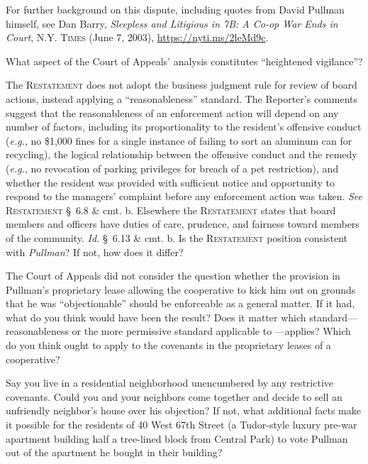 
\item For further background on this dispute, including quotes from David
Pullman himself, see Dan Barry, \textit{Sleepless and Litigious in 7B: A Co-op
War Ends in Court}, \textsc{N.Y. Times} (June 7, 2003),
\url{https://nyti.ms/2leMd9c}.

\item What aspect of the Court of Appeals' analysis constitutes ``heightened
vigilance''?

\item The \textsc{Restatement} does not adopt the business judgment rule for
review of
board actions, instead applying a ``reasonableness'' standard. The Reporter's
comments suggest that the reasonableness of an enforcement action will depend on
any number of factors, including its proportionality to the resident's offensive
conduct (\textit{e.g.}, no \$1,000 fines for a single instance of failing to
sort an aluminum can for recycling), the logical relationship between the
offensive conduct and the remedy (\textit{e.g.}, no revocation of parking
privileges for breach of a pet restriction), and whether the resident was
provided with sufficient notice and opportunity to respond to the managers'
complaint before any enforcement action was taken. \textit{See}
\textsc{Restatement} \S~6.8 \& cmt. b. Elsewhere the \textsc{Restatement} states
that
board members and officers have duties of care, prudence, and fairness toward
members of the community. \textit{Id.} \S~6.13 \& cmt. b. Is the
\textsc{Restatement}
position consistent with \textit{Pullman}? If not, how does it differ?

\item The Court of Appeals did not consider the question whether the provision
in Pullman's proprietary lease allowing the cooperative to kick him out on
grounds that he was ``objectionable'' should be enforceable as a general matter.
If it had, what do you think would have been the result? Does it matter which
standard---reasonableness or the more permissive standard applicable to
---applies? Which do you think ought to apply to the covenants in
the proprietary leases of a cooperative?

\item Say you live in a residential neighborhood unencumbered by any restrictive
covenants. Could you and your neighbors come together and decide to sell an
unfriendly neighbor's house over his objection? If not, what additional facts
make it possible for the residents of 40 West 67th Street (a Tudor-style luxury
pre-war apartment building half a tree-lined block from Central Park) to vote
Pullman out of the apartment he bought in their building?

